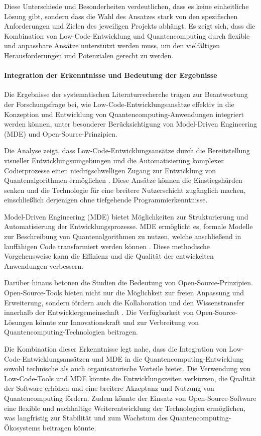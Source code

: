 Diese Unterschiede und Besonderheiten verdeutlichen, dass es keine einheitliche Lösung gibt, sondern dass die Wahl 
des Ansatzes stark von den spezifischen Anforderungen und Zielen des jeweiligen Projekts abhängt. Es zeigt sich, dass 
die Kombination von Low-Code-Entwicklung und Quantencomputing durch flexible und anpassbare Ansätze unterstützt werden 
muss, um den vielfältigen Herausforderungen und Potenzialen gerecht zu werden.

\paragraph{Integration der Erkenntnisse und Bedeutung der Ergebnisse}

Die Ergebnisse der systematischen Literaturrecherche tragen zur Beantwortung der Forschungsfrage bei, 
wie Low-Code-Entwicklungsansätze effektiv in die Konzeption und Entwicklung von Quantencomputing-Anwendungen 
integriert werden können, unter besonderer Berücksichtigung von Model-Driven Engineering (MDE) und Open-Source-Prinzipien.

Die Analyse zeigt, dass Low-Code-Entwicklungsansätze durch die Bereitstellung visueller Entwicklungsumgebungen 
und die Automatisierung komplexer Codierprozesse einen niedrigschwelligen Zugang zur Entwicklung von 
Quantenalgorithmen ermöglichen \cite{Sahay_2020, Bock_2021}. Diese Ansätze können die Einstiegshürden senken und 
die Technologie für eine breitere Nutzerschicht zugänglich machen, einschließlich derjenigen ohne tiefgehende 
Programmierkenntnisse.

Model-Driven Engineering (MDE) bietet Möglichkeiten zur Strukturierung und Automatisierung der Entwicklungsprozesse. 
MDE ermöglicht es, formale Modelle zur Beschreibung von Quantenalgorithmen zu nutzen, welche anschließend in 
lauffähigen Code transformiert werden können \cite{Gemeinhardt_2021, Perez-Castillo_2022}. Diese methodische 
Vorgehensweise kann die Effizienz und die Qualität der entwickelten Anwendungen verbessern.

Darüber hinaus betonen die Studien die Bedeutung von Open-Source-Prinzipien. Open-Source-Tools bieten nicht nur 
die Möglichkeit zur freien Anpassung und Erweiterung, sondern fördern auch die Kollaboration und den Wissenstransfer 
innerhalb der Entwicklergemeinschaft \cite{Amato_2023, Ahmad_2023}. Die Verfügbarkeit von Open-Source-Lösungen 
könnte zur Innovationskraft und zur Verbreitung von Quantencomputing-Technologien beitragen.

Die Kombination dieser Erkenntnisse legt nahe, dass die Integration von Low-Code-Entwicklungsansätzen und MDE in 
die Quantencomputing-Entwicklung sowohl technische als auch organisatorische Vorteile bietet. Die Verwendung von 
Low-Code-Tools und MDE könnte die Entwicklungszeiten verkürzen, die Qualität der Software erhöhen und eine breitere 
Akzeptanz und Nutzung von Quantencomputing fördern. Zudem könnte der Einsatz von Open-Source-Software eine flexible 
und nachhaltige Weiterentwicklung der Technologien ermöglichen, was langfristig zur Stabilität und zum Wachstum des 
Quantencomputing-Ökosystems beitragen könnte.

